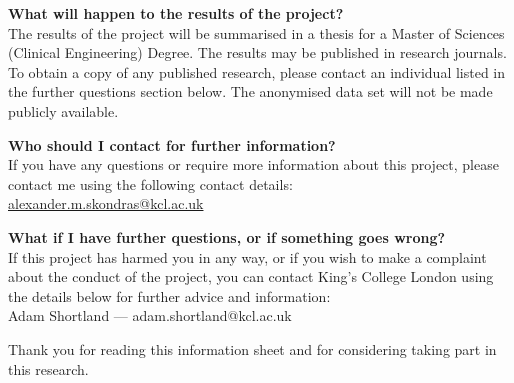 \documentclass[12pt]{article}
\begin{document}
\vspace{1.25em}
\noindent\textbf{What will happen to the results of the project?}\\
The results of the project will be summarised in a thesis for a Master of Sciences (Clinical Engineering) Degree. The results may be published in research journals. To obtain a copy of any published research, please contact an individual listed in the further questions section below. The anonymised data set will not be made publicly available.

\vspace{1.25em}
\noindent\textbf{Who should I contact for further information?}\\
If you have any questions or require more information about this project, please contact me using the following contact details:\\
\href{mailto:alexander.m.skondras@kcl.ac.uk}{alexander.m.skondras@kcl.ac.uk}

\vspace{1.25em}
\noindent\textbf{What if I have further questions, or if something goes wrong?}\\
If this project has harmed you in any way, or if you wish to make a complaint about the conduct of the project, you can contact King's College London using the details below for further advice and information:\\
Adam Shortland --- adam.shortland@kcl.ac.uk

\vspace{0.5em}
\noindent Thank you for reading this information sheet and for considering taking part in this research.
\end{document}
